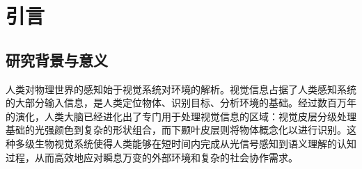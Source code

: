 
\chapter{引言}
\label{cha:intro}
\section{研究背景与意义}



人类对物理世界的感知始于视觉系统对环境的解析。视觉信息占据了人类感知系统的大部分输入信息，是人类定位物体、识别目标、分析环境的基础。经过数百万年的演化，人类大脑已经进化出了专门用于处理视觉信息的区域：视觉皮层分级处理基础的光强颜色到复杂的形状组合，而下颞叶皮层则将物体概念化以进行识别。这种多级生物视觉系统使得人类能够在短时间内完成从光信号感知到语义理解的认知过程，从而高效地应对瞬息万变的外部环境和复杂的社会协作需求。



